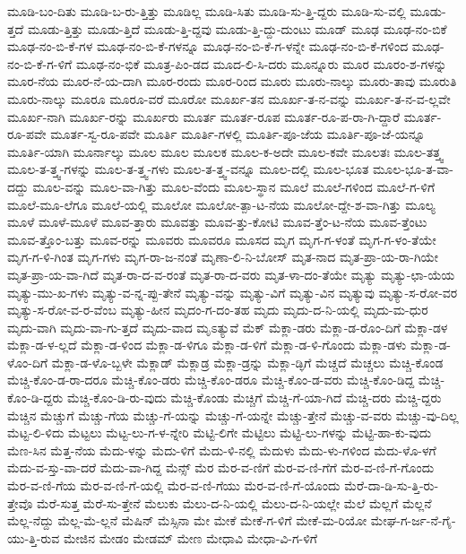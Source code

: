 {ಮೂಡಿ-ಬಂ-ದಿತು
ಮೂಡಿ-ಬ-ರು-ತ್ತಿತ್ತು
ಮೂಡಿಲ್ಲ
ಮೂಡಿ-ಸಿತು
ಮೂಡಿ-ಸು-ತ್ತಿ-ದ್ದರು
ಮೂಡಿ-ಸು-ವಲ್ಲಿ
ಮೂಡು-ತ್ತದೆ
ಮೂಡು-ತ್ತಿತ್ತು
ಮೂಡು-ತ್ತಿದೆ
ಮೂಡು-ತ್ತಿ-ದ್ದವು
ಮೂಡು-ತ್ತಿ-ದ್ದು-ದುಂಟು
ಮೂಡ್
ಮೂಢ
ಮೂಢ-ನಂ-ಬಿಕೆ
ಮೂಢ-ನಂ-ಬಿ-ಕೆ-ಗಳ
ಮೂಢ-ನಂ-ಬಿ-ಕೆ-ಗಳನ್ನೂ
ಮೂಢ-ನಂ-ಬಿ-ಕೆ-ಗ-ಳನ್ನೇ
ಮೂಢ-ನಂ-ಬಿ-ಕೆ-ಗಳಿಂದ
ಮೂಢ-ನಂ-ಬಿ-ಕೆ-ಗ-ಳಿಗೆ
ಮೂಢ-ನಂ-ಭಿಕೆ
ಮೂತ್ರ-ಪಿಂ-ಡದ
ಮೂದ-ಲಿ-ಸಿ-ದರು
ಮೂನ್ನೂರು
ಮೂರ
ಮೂರಂ-ಶ-ಗಳನ್ನು
ಮೂರ-ನೆಯ
ಮೂರ-ನೆ-ಯ-ದಾಗಿ
ಮೂರ-ರಂದು
ಮೂರ-ರಿಂದ
ಮೂರು
ಮೂರು-ನಾಲ್ಕು
ಮೂರು-ತಾವು
ಮೂರುತಿ
ಮೂರು-ನಾಲ್ಕು
ಮೂರೂ
ಮೂರೂ-ವರೆ
ಮೂರೋ
ಮೂರ್ಖ-ತನ
ಮೂರ್ಖ-ತ-ನ-ವನ್ನು
ಮೂರ್ಖ-ತ-ನ-ವ-ಲ್ಲವೇ
ಮೂರ್ಖ-ನಾಗಿ
ಮೂರ್ಖ-ರನ್ನು
ಮೂರ್ಖರು
ಮೂರ್ತ
ಮೂರ್ತ-ರೂಪ
ಮೂರ್ತ-ರೂ-ಪ-ರಾ-ಗಿ-ದ್ದಾರೆ
ಮೂರ್ತ-ರೂ-ಪವೇ
ಮೂರ್ತ-ಸ್ವ-ರೂ-ಪವೇ
ಮೂರ್ತಿ
ಮೂರ್ತಿ-ಗಳಲ್ಲಿ
ಮೂರ್ತಿ-ಪೂ-ಜೆಯ
ಮೂರ್ತಿ-ಪೂ-ಜೆ-ಯನ್ನೂ
ಮೂರ್ತಿ-ಯಾಗಿ
ಮೂರ್ನಾಲ್ಕು
ಮೂಲ
ಮೂಲ
ಮೂಲಕ
ಮೂಲ-ಕ-ಅದೇ
ಮೂಲ-ಕವೇ
ಮೂಲತಃ
ಮೂಲ-ತತ್ತ್ವ
ಮೂಲ-ತ-ತ್ತ್ವ-ಗಳನ್ನು
ಮೂಲ-ತ-ತ್ತ್ವ-ಗಳು
ಮೂಲ-ತ-ತ್ತ್ವ-ವನ್ನೂ
ಮೂಲ-ದಲ್ಲಿ
ಮೂಲ-ಭೂತ
ಮೂಲ-ಭೂ-ತ-ವಾ-ದದ್ದು
ಮೂಲ-ವನ್ನು
ಮೂಲ-ವಾ-ಗಿತ್ತು
ಮೂಲ-ವೆಂದು
ಮೂಲ-ಸ್ಥಾನ
ಮೂಲೆ
ಮೂಲೆ-ಗಳಿಂದ
ಮೂಲೆ-ಗ-ಳಿಗೆ
ಮೂಲೆ-ಮೂ-ಲೆಗೂ
ಮೂಲೆ-ಯಲ್ಲಿ
ಮೂಲೋ
ಮೂಲೋ-ತ್ಪಾ-ಟ-ನೆಯ
ಮೂಲೋ-ದ್ದೇ-ಶ-ವಾ-ಗಿತ್ತು
ಮೂಲ್ಯ
ಮೂಳೆ
ಮೂಳೆ-ಮೂಳೆ
ಮೂವ-ತ್ತಾರು
ಮೂವತ್ತು
ಮೂವ-ತ್ತು-ಕೋಟಿ
ಮೂವ-ತ್ತೆಂ-ಟ-ನೆಯ
ಮೂವ-ತ್ತೆಂಟು
ಮೂವ-ತ್ತೊಂ-ಬತ್ತು
ಮೂವ-ರನ್ನು
ಮೂವರು
ಮೂವರೂ
ಮೂಸದ
ಮೃಗ
ಮೃಗ-ಗ-ಳಂತೆ
ಮೃಗ-ಗ-ಳಂ-ತೆಯೇ
ಮೃಗ-ಗ-ಳಿ-ಗಿಂತ
ಮೃಗ-ಗಳು
ಮೃಗ-ರಾ-ಜ-ನಂತೆ
ಮೃಣಾ-ಲಿ-ನಿ-ಬೋಸ್
ಮೃತ-ನಾದ
ಮೃತ-ಪ್ರಾ-ಯ-ರಾ-ಗಿಯೇ
ಮೃತ-ಪ್ರಾ-ಯ-ವಾ-ಗಿದೆ
ಮೃತ-ರಾ-ದ-ವ-ರಂತೆ
ಮೃತ-ರಾ-ದ-ವರು
ಮೃತ-ಳಾ-ದಂ-ತೆಯೇ
ಮೃತ್ಯು
ಮೃತ್ಯು-ಛಾ-ಯೆಯ
ಮೃತ್ಯು-ಮು-ಖ-ಗಳು
ಮೃತ್ಯು-ವ-ನ್ನ-ಪ್ಪು-ತೇನೆ
ಮೃತ್ಯು-ವನ್ನು
ಮೃತ್ಯು-ವಿಗೆ
ಮೃತ್ಯು-ವಿನ
ಮೃತ್ಯುವು
ಮೃತ್ಯು-ಸ-ರೋ-ವರ
ಮೃತ್ಯು-ಸ-ರೋ-ವ-ರ-ವೆಂಬ
ಮೃತ್ಯು-ಹೀನ
ಮೃದಂ-ಗ-ದಂ-ತಹ
ಮೃದು
ಮೃದು-ದ-ನಿ-ಯಲ್ಲಿ
ಮೃದು-ಮ-ಧುರ
ಮೃದು-ವಾಗಿ
ಮೃದು-ವಾ-ಗು-ತ್ತದೆ
ಮೃದು-ವಾದ
ಮೃಽತ್ಯುವೆ
ಮೆಕ್
ಮೆಕ್ಲಾ-ಡರು
ಮೆಕ್ಲಾ-ಡ-ರೊಂ-ದಿಗೆ
ಮೆಕ್ಲಾ-ಡಳ
ಮೆಕ್ಲಾ-ಡ-ಳ-ಲ್ಲದೆ
ಮೆಕ್ಲಾ-ಡ-ಳಿಂದ
ಮೆಕ್ಲಾ-ಡ-ಳಿಗೂ
ಮೆಕ್ಲಾ-ಡ-ಳಿಗೆ
ಮೆಕ್ಲಾ-ಡ-ಳಿ-ಗೊಂದು
ಮೆಕ್ಲಾ-ಡಳು
ಮೆಕ್ಲಾ-ಡ-ಳೊಂ-ದಿಗೆ
ಮೆಕ್ಲಾ-ಡ-ಳೊ-ಬ್ಬಳೇ
ಮೆಕ್ಲಾಡ್
ಮೆಕ್ಲಾಡ್ರ
ಮೆಕ್ಲಾ-ಡ್ರನ್ನು
ಮೆಕ್ಲಾ-ಡ್ಳಿಗೆ
ಮೆಚ್ಚದೆ
ಮೆಚ್ಚಲು
ಮೆಚ್ಚಿ-ಕೊಂಡ
ಮೆಚ್ಚಿ-ಕೊಂ-ಡ-ರಾ-ದರೂ
ಮೆಚ್ಚಿ-ಕೊಂ-ಡರು
ಮೆಚ್ಚಿ-ಕೊಂ-ಡರೂ
ಮೆಚ್ಚಿ-ಕೊಂ-ಡ-ವರು
ಮೆಚ್ಚಿ-ಕೊಂ-ಡಿದ್ದ
ಮೆಚ್ಚಿ-ಕೊಂ-ಡಿ-ದ್ದರು
ಮೆಚ್ಚಿ-ಕೊಂ-ಡಿ-ರು-ವುದು
ಮೆಚ್ಚಿ-ಕೊಂಡು
ಮೆಚ್ಚಿಗೆ
ಮೆಚ್ಚಿ-ಗೆ-ಯಾ-ಗಿದೆ
ಮೆಚ್ಚಿ-ದರು
ಮೆಚ್ಚಿ-ದ್ದರು
ಮೆಚ್ಚಿನ
ಮೆಚ್ಚುಗೆ
ಮೆಚ್ಚು-ಗೆಯ
ಮೆಚ್ಚು-ಗೆ-ಯನ್ನು
ಮೆಚ್ಚು-ಗೆ-ಯನ್ನೇ
ಮೆಚ್ಚು-ತ್ತೇನೆ
ಮೆಚ್ಚು-ವ-ವರು
ಮೆಚ್ಚು-ವು-ದಿಲ್ಲ
ಮೆಟ್ಟ-ಲಿ-ಳಿದು
ಮೆಟ್ಟಲು
ಮೆಟ್ಟ-ಲು-ಗ-ಳ-ನ್ನೇರಿ
ಮೆಟ್ಟಿ-ಲಿಗೇ
ಮೆಟ್ಟಿಲು
ಮೆಟ್ಟಿ-ಲು-ಗಳನ್ನು
ಮೆಟ್ಟಿ-ಹಾ-ಕು-ವುದು
ಮೆಣ-ಸಿನ
ಮೆತ್ತ-ನೆಯ
ಮೆದು-ಳನ್ನು
ಮೆದು-ಳಿಗೆ
ಮೆದು-ಳಿ-ನಲ್ಲಿ
ಮೆದುಳು
ಮೆದು-ಳು-ಗಳಿಂದ
ಮೆದು-ಳೊ-ಳಗೆ
ಮೆದು-ವ-ಸ್ತು-ವಾ-ದರೆ
ಮೆದು-ವಾ-ಗಿದ್ದ
ಮೆನ್ಸ್
ಮೆರ
ಮೆರ-ವ-ಣಿಗೆ
ಮೆರ-ವ-ಣಿ-ಗೆಗೆ
ಮೆರ-ವ-ಣಿ-ಗೆ-ಗೊಂದು
ಮೆರ-ವ-ಣಿ-ಗೆಯ
ಮೆರ-ವ-ಣಿ-ಗೆ-ಯಲ್ಲಿ
ಮೆರ-ವ-ಣಿ-ಗೆಯು
ಮೆರ-ವ-ಣಿ-ಗೆ-ಯೊಂದು
ಮೆರೆ-ದಾ-ಡಿ-ಸು-ತ್ತಿ-ರು-ತ್ತೇವೊ
ಮೆರೆ-ಸುತ್ತ
ಮೆರೆ-ಸು-ತ್ತೇನೆ
ಮೆಲುಕು
ಮೆಲು-ದ-ನಿ-ಯಲ್ಲಿ
ಮೆಲು-ದ-ನಿ-ಯಲ್ಲೇ
ಮೆಲೆ
ಮೆಲ್ಲಗೆ
ಮೆಲ್ಲನೆ
ಮೆಲ್ಲ-ನೆದ್ದು
ಮೆಲ್ಲ-ಮೆ-ಲ್ಲನೆ
ಮೆಷಿನ್
ಮೆಸ್ಸಿನಾ
ಮೇ
ಮೇಕೆ
ಮೇಕೆ-ಗ-ಳಿಗೆ
ಮೇಕೆ-ಮ-ರಿಯೋ
ಮೇಘ-ಗ-ರ್ಜ-ನೆ-ಗೈ-ಯು-ತ್ತಿ-ರುವ
ಮೇಜಿನ
ಮೇಡಂ
ಮೇಡಮ್
ಮೇಣ
ಮೇಧಾವಿ
ಮೇಧಾ-ವಿ-ಗ-ಳಿಗೆ
}
